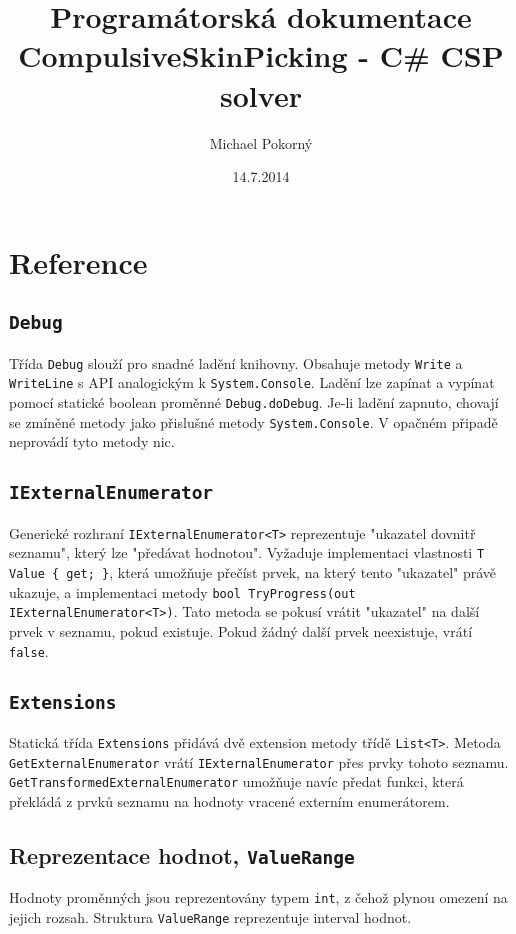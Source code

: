 \documentclass[a4paper]{article}
\begin{document}
\title{Programátorská dokumentace \\ CompulsiveSkinPicking - C\# CSP solver}
\author{Michael Pokorný}
\date{14.7.2014}

\maketitle

\tableofcontents

\section{Reference}

\subsection{\texttt{Debug}}
Třída \texttt{Debug} slouží pro snadné ladění knihovny. Obsahuje metody
\texttt{Write} a \texttt{WriteLine} s API analogickým k \texttt{System.Console}.
Ladění lze zapínat a vypínat pomocí statické boolean proměnné
\texttt{Debug.doDebug}. Je-li ladění zapnuto, chovají se zmíněné metody jako
přislušné metody \texttt{System.Console}. V opačném připadě neprovádí tyto
metody nic.

\subsection{\texttt{IExternalEnumerator}}
Generické rozhraní \texttt{IExternalEnumerator<T>} reprezentuje "ukazatel
dovnitř seznamu", který lze "předávat hodnotou".
Vyžaduje implementaci vlastnosti \texttt{T Value \{ get; \}}, která umožňuje
přečíst prvek, na který tento "ukazatel" právě ukazuje, a implementaci
metody \texttt{bool TryProgress(out IExternalEnumerator<T>)}. Tato metoda se
pokusí vrátit "ukazatel" na další prvek v seznamu, pokud existuje. Pokud žádný
další prvek neexistuje, vrátí \texttt{false}.

\subsection{\texttt{Extensions}}
Statická třída \texttt{Extensions} přidává dvě extension metody třídě
\texttt{List<T>}. Metoda \texttt{GetExternalEnumerator} vrátí
\texttt{IExternalEnumerator} přes prvky tohoto seznamu.
\texttt{GetTransformedExternalEnumerator} umožňuje navíc předat funkci, která
překládá z prvků seznamu na hodnoty vracené externím enumerátorem.

\subsection{Reprezentace hodnot, \texttt{ValueRange}}
Hodnoty proměnných jsou reprezentovány typem \texttt{int}, z čehož plynou
omezení na jejich rozsah. Struktura \texttt{ValueRange} reprezentuje interval
hodnot.
\end{document}
